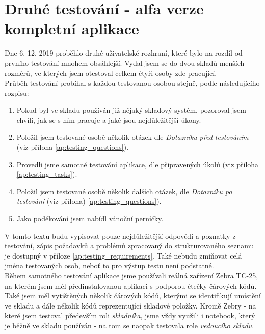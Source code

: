 \section{Druhé testování - alfa verze kompletní aplikace}\label{sec:usertest}

Dne 6. 12. 2019 proběhlo druhé uživatelské rozhraní, které bylo na rozdíl od prvního testování mnohem obsáhlejší. Vydal jsem se do dvou skladů menších rozměrů, ve kterých jsem otestoval celkem čtyři osoby zde pracující.\\
Průběh testování probíhal s každou testovanou osobou stejně, podle následujícího rozpisu:
\begin{enumerate}
	\item Pokud byl ve skladu používán již nějaký skladový systém, pozoroval jsem chvíli, jak se s ním pracuje a jaké jsou nejdůležitější úkony.
	\item Položil jsem testované osobě několik otázek dle \emph{Dotazníku před testováním} (viz příloha \ref{ap:testing_questions}).
	\item Provedli jsme samotné testování aplikace, dle připravených úkolů (viz příloha \ref{ap:testing_tasks}).
	\item Položil jsem testované osobě několik dalších otázek, dle \emph{Dotazníku po testování} (viz příloha) \ref{ap:testing_questions}).
	\item Jako poděkování jsem nabídl vánoční perníčky.
\end{enumerate}

V tomto textu budu vypisovat pouze nejdůležitější odpovědi a poznatky z testování, zápis požadavků a problémů zpracovaný do strukturovaného seznamu je dostupný v příloze \ref{ap:testing_requirements}. Také nebudu zmiňovat celá jména testovaných osob, neboť to pro výstup testu není podstatné.
\\
Během samotného testování aplikace jsme používali reálná zařízení Zebra TC-25, na kterém jsem měl předinstalovanou aplikaci s podporou čtečky čárových kódů. Také jsem měl vytištěných několik čárových kódů, kterými se identifikují umístění ve skladu a dále několik kódů reprezentující skladové položky. Kromě Zebry - na které jsem testoval především roli \emph{skladníka}, jsme vždy využili i notebook, který je běžně ve skladu používán - na tom se naopak testovala role \emph{vedoucího skladu}.


